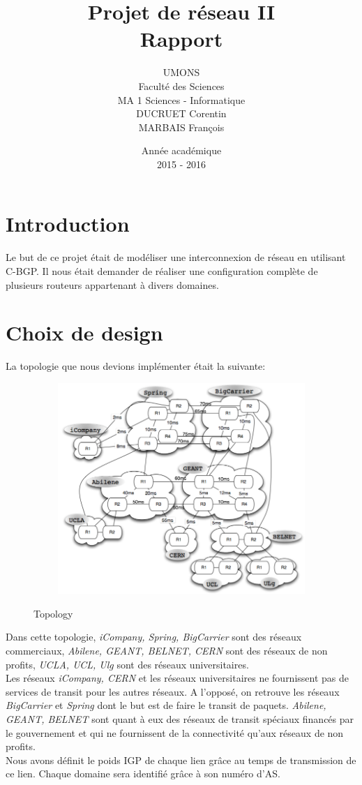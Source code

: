 \documentclass[a4paper,12pt]{report} %
\title{Projet de réseau II\\Rapport}
\author{UMONS\\Faculté des Sciences\\MA 1 Sciences - Informatique\\DUCRUET Corentin \\MARBAIS François}
\date{Année académique\\2015 - 2016}
\begin{document}
 
\maketitle
\newpage 
\tableofcontents 
\newpage
\raggedright

\section{Introduction}
Le but de ce projet était de modéliser une interconnexion de réseau en utilisant C-BGP. Il nous était demander de réaliser une configuration complète de plusieurs routeurs appartenant à divers domaines.

\section{Choix de design}
La topologie que nous devions implémenter était la suivante:
\begin{figure}[!h] %
		\centering
		\includegraphics[width=120mm,height=80mm]{topologie}
		\label{topo}
		\caption{Topology}
	\end{figure} 

Dans cette topologie, \textit{iCompany, Spring, BigCarrier} sont des réseaux commerciaux,  \textit{Abilene, GEANT, BELNET, CERN} sont des réseaux de non profits, \textit{UCLA, UCL, Ulg} sont des réseaux universitaires.\\
Les réseaux \textit{iCompany, CERN} et les réseaux universitaires ne fournissent pas de services de transit pour les autres réseaux. A l'opposé, on retrouve les réseaux \textit{BigCarrier} et \textit{Spring} dont le but est de faire le transit de paquets. \textit{Abilene, GEANT, BELNET} sont quant à eux des réseaux de transit spéciaux financés par le gouvernement et qui ne fournissent de la connectivité qu'aux réseaux  de non profits.\\
Nous avons définit le poids IGP de chaque lien grâce au temps de transmission de ce lien. Chaque domaine sera identifié grâce à son numéro d'AS.\\
\end{document}
